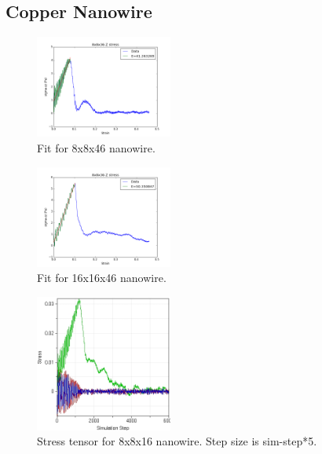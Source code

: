 \documentclass[11pt]{report}
\begin{document}
        \subsection{Copper Nanowire}
        \begin{figure}
            \label{fig:stress-small-fit}
            \centering
            \includegraphics[width=0.4\textwidth]{sigma33-small-fit.png}
            \caption{Fit for 8x8x46 nanowire.}
        \end{figure}
        \begin{figure}
            \label{fig:stress-large-fit}
            \centering
            \includegraphics[width=0.4\textwidth]{sigma33-large-fit.png}
            \caption{Fit for 16x16x46 nanowire.}
        \end{figure}
        \begin{figure}
            \label{fig:rawdata-small}
            \centering
            \includegraphics[width=0.4\textwidth]{StressvsSimulationStep-small.jpg}
            \caption{Stress tensor for 8x8x16 nanowire. Step size is sim-step*5.}
        \end{figure}
\end{document}
